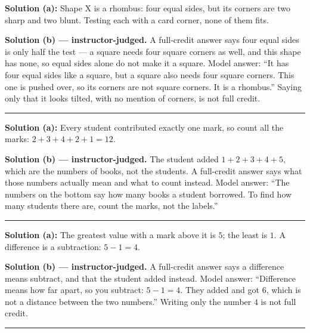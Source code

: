 \documentclass[12pt]{article}
\begin{document}
\textbf{Solution (a):} Shape X is a rhombus: four equal sides, but its corners are two sharp and two
blunt. Testing each with a card corner, none of them fits. 

\textbf{Solution (b) --- instructor-judged.} A full-credit answer says four equal sides is only half the
test --- a square needs four square corners as well, and this shape has none, so equal sides alone do
not make it a square. Model answer: ``It has four equal sides like a square, but a square also needs
four square corners. This one is pushed over, so its corners are not square corners. It is a rhombus.''
Saying only that it looks tilted, with no mention of corners, is not full credit.

\vspace{0.15cm}\noindent\rule{\linewidth}{0.2pt}


\textbf{Solution (a):} Every student contributed exactly one mark, so count all the marks:
$2 + 3 + 4 + 2 + 1 = 12$. 

\textbf{Solution (b) --- instructor-judged.} The student added $1 + 2 + 3 + 4 + 5$, which are the
numbers of books, not the students. A full-credit answer says what those numbers actually mean and
what to count instead. Model answer: ``The numbers on the bottom say how many books a student
borrowed. To find how many students there are, count the marks, not the labels.''

\vspace{0.15cm}\noindent\rule{\linewidth}{0.2pt}


\textbf{Solution (a):} The greatest value with a mark above it is $5$; the least is $1$. A difference
is a subtraction: $5 - 1 = 4$. 

\textbf{Solution (b) --- instructor-judged.} A full-credit answer says a difference means subtract, and
that the student added instead. Model answer: ``Difference means how far apart, so you subtract:
$5 - 1 = 4$. They added and got $6$, which is not a distance between the two numbers.'' Writing only
the number $4$ is not full credit.

\vspace{0.15cm}\noindent\rule{\linewidth}{0.2pt}

\end{document}
